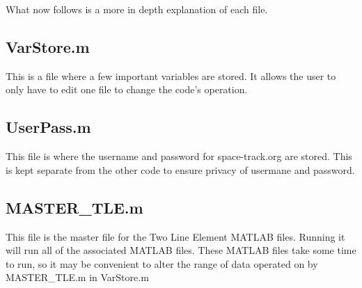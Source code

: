 \documentclass[12pt]{article}
\begin{document}
	What now follows is a more in depth explanation of each file. 
		\subsection{VarStore.m}
		This is a file where a few important variables are stored. It allows the user to only have to edit one file to change the code's operation.
		\subsection{UserPass.m}
		This file is where the username and password for space-track.org are stored. This is kept separate from the other code to ensure privacy of usermane and password. 
		\subsection{MASTER\_TLE.m}
		This file is the master file for the Two Line Element MATLAB files. Running it will run all of the associated MATLAB files. These MATLAB files take some time to run, so it may be convenient to alter the range of data operated on by MASTER\_TLE.m in VarStore.m
\end{document}
